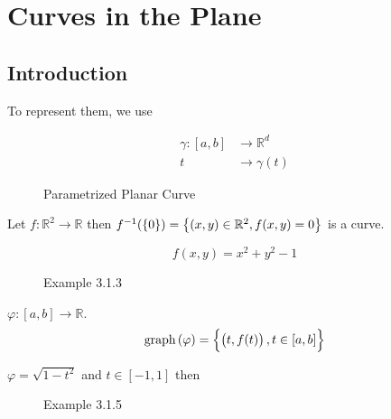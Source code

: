 \chapter{Curves in the Plane}
\section{Introduction}
\label{sec:Introduction}

To represent them, we use 
\begin{defn}
    \begin{align*}
        \gamma : [a,b] &\to \mathbb{R}^d \\
        t &\to \gamma(t)  
    \end{align*}
    \label{def:Parametrized Curves}
\end{defn}

\begin{figure}[ht]
    \centering
    \caption{Parametrized Planar Curve}
    \label{fig:planar-curve}
\end{figure}


\begin{defn}
    Let $ f : \mathbb{R}^2 \to \mathbb{R} $
    then $ f^{-1} ( \set{ 0 } ) = \set{ (x,y) \in \mathbb{R}^2, f(x,y) = 0 }  $
    is a curve.
    \label{def:Implicit Curves}
\end{defn}

\begin{exmp}[]
    \[
        f(x,y) = x^2 + y^2 -1 
    \]
\end{exmp}

\begin{figure}[ht]
    \centering
    \caption{Example 3.1.3}
    \label{fig:example313}
\end{figure}


\begin{defn}
    $ \varphi : [a,b] \to \mathbb{R} $. 
    \[
        \text{graph} \left( \varphi\right) = \set{ \left( t, f(t) \right) , t \in [a,b]  } 
    \]
    \label{def:Graphs of Functions}
\end{defn}

\newpage
\begin{exmp}[]
    $ \varphi = \sqrt{1 - t^2}  $ and $ t \in [-1,1]  $ then 
\end{exmp}

\begin{figure}[ht]
    \centering
    \caption{Example 3.1.5}
    \label{fig:example315}
\end{figure}





